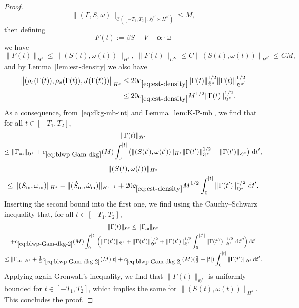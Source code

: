 \documentclass[AHL,Unicode,longabstracts,published]{cedram}
\newcommand{\rmin}{\mathrm{in}}
\newcommand{\cC}{\mathcal{C}}
\newcommand{\gH}{\mathfrak{H}}
\newcommand\ii{{\ensuremath {\infty}}}
\renewcommand\d[1]{{\ensuremath{\,\text{d}#1}}}
\begin{document}
\begin{proof}
\[
\|(\Gamma,S,\omega)\|_{\cC\left([-T_1,T_2],\gH^{s'}\times H^{s'}\right)}\leq M,
\]
then defining
\[
F(t):={ \beta}S + V - {\bm \alpha}\cdot {\bm \omega}
\]
we have
\[
\|F(t)\|_{H^s}\leq \|(S(t),\omega(t))\|_{H^s},\ \|F(t)\|_{L^\ii}\leq C\|(S(t),\omega(t))\|_{H^{s'}}\leq C M,
\]
and by Lemma~\ref{lem:est-density} we also have
\begin{align*}
\big\|(\rho_s(\Gamma(t)),\rho_v(\Gamma(t)),J(\Gamma(t)))\big\|_{H^s}&\leq 20 c_{\eqref{eq:est-density}}\|\Gamma(t)\|_{\gH^{s}}^{1/2}\|\Gamma(t)\|_{\gH^{s'}}^{1/2}\\
&\leq 20 c_{\eqref{eq:est-density}} M^{1/2} \|\Gamma(t)\|_{\gH^{s}}^{1/2}.
\end{align*}
As a consequence, from~\eqref{eq:dkg-mb-int} and Lemma~\ref{lem:K-P-mb}, we find that for all $t\in[-T_1,T_2]$,
\begin{multline}\label{eq:blwp-Gam-dkg}
\|\Gamma(t)\|_{\gH^s}\\
\leq\|\Gamma_{\rmin}\|_{\gH^s}+c_{\eqref{eq:blwp-Gam-dkg}}(M)\int_0^{|t|}\big(\|(S(t'),\omega(t'))\|_{H^s}\|\Gamma(t')\|_{\gH^s}^{1/2}+\|\Gamma(t')\|_{\gH^s}\big)\,\d t',
\end{multline}
\begin{multline*}
\|(S(t),\omega(t))\|_{H^s}\\
\leq \|(S_{\rmin},\omega_{\rmin})\|_{H^s}+\|(\dot{S}_{\rmin},\dot{\omega}_{\rmin})\|_{H^{s-1}}+20 c_{\eqref{eq:est-density}} M^{1/2}\int_0^{|t|}\|\Gamma(t')\|_{\gH^{s}}^{1/2}\,\d t'.
\end{multline*}
Inserting the second bound into the first one, we find using the Cauchy--Schwarz inequality that, for all $t\in[-T_1,T_2]$,
\begin{multline}\label{eq:blwp-Gam-dkg-2}
\|\Gamma(t)\|_{\gH^s}
\leq \|\Gamma_{\rmin}\|_{\gH^s}\\
+c_{\eqref{eq:blwp-Gam-dkg-2}}(M)\int_0^{|t|}\Big(\|\Gamma(t')\|_{\gH^s} +\|\Gamma(t')\|_{\gH^s}^{1/2}+\|\Gamma(t')\|_{\gH^s}^{1/2}\int_0^{|t'|}\|\Gamma(t'')\|_{\gH^s}^{1/2}\,\d t''\Big)\d t' 
\\
\leq \|\Gamma_{\rmin}\|_{\gH^s}+\tfrac12c_{\eqref{eq:blwp-Gam-dkg-2}}(M)|t|+ c_{\eqref{eq:blwp-Gam-dkg-2}}(M)(\tfrac32+|t|) \int_0^{|t|} \|\Gamma(t')\|_{\gH^s}\d t'.
\end{multline}
Applying again Gronwall's inequality, we find that $\|\Gamma(t)\|_{\gH^s}$ is uniformly bounded for $t\in[-T_1,T_2]$, which implies the same for $\|(S(t),\omega(t))\|_{H^s}$. This concludes the proof.
\end{proof}
\end{document}
